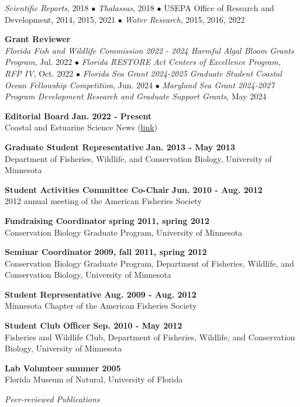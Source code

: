 \documentclass[letterpaper,12pt]{article}
\newcommand{\sectitle}[1]{\vspace{\baselineskip} \centerline{\large{\textit{#1}}}}
\begin{document}
\textit{Scientific Reports}, 2018 $\bullet$ \textit{Thalassas}, 2018 $\bullet$ USEPA Office of Research and Development, 2014, 2015, 2021 $\bullet$ \textit{Water Research}, 2015, 2016, 2022

{\bf Grant Reviewer} \hfill \\
\textit{Florida Fish and Wildlife Commission 2022 - 2024 Harmful Algal Bloom Grants Program}, Jul. 2022 $\bullet$ \textit{Florida RESTORE Act Centers of Excellence Program, RFP IV}, Oct. 2022 $\bullet$ \textit{Florida Sea Grant 2024-2025 Graduate Student Coastal Ocean Fellowship Competition}, Jun. 2024 $\bullet$ \textit{Maryland Sea Grant 2024-2027 Program Development Research and Graduate Support Grants}, May 2024

{\bf Editorial Board} \hfill {\bf Jan. 2022 - Present} \\
Coastal and Estuarine Science News (\href{https://www.cerf.science/cesn}{link})

{\bf Graduate Student Representative} \hfill {\bf Jan. 2013 - May 2013} \\
Department of Fisheries, Wildlife, and Conservation Biology, University of Minnesota

{\bf Student Activities Committee Co-Chair} \hfill {\bf Jun. 2010 - Aug. 2012} \\
2012 annual meeting of the American Fisheries Society

{\bf Fundraising Coordinator} \hfill {\bf spring 2011, spring 2012} \\
Conservation Biology Graduate Program, University of Minnesota

{\bf Seminar Coordinator} \hfill {\bf 2009, fall 2011, spring 2012} \\
Conservation Biology Graduate Program, Department of Fisheries, Wildlife, and Conservation Biology, University of Minnesota

{\bf Student Representative} \hfill {\bf Aug. 2009 - Aug. 2012} \\
Minnesota Chapter of the American Fisheries Society

{\bf Student Club Officer} \hfill {\bf Sep. 2010 - May 2012} \\
Fisheries and Wildlife Club, Department of Fisheries, Wildlife, and Conservation Biology, University of Minnesota 

{\bf Lab Volunteer} \hfill {\bf summer 2005} \\
Florida Museum of Natural, University of Florida

\sectitle{Peer-reviewed Publications}
\end{document}
